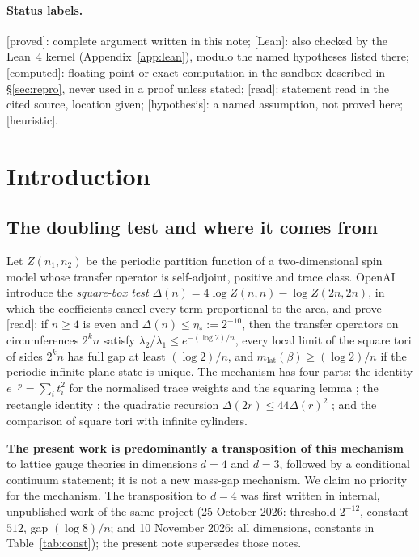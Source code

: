 \documentclass[11pt,a4paper]{article}
\theoremstyle{plain}
\theoremstyle{definition}
\theoremstyle{remark}
\numberwithin{equation}{section}
\newcommand{\st}[1]{\textsf{[#1]}}
\begin{document}
\paragraph{Status labels.}
\st{proved}: complete argument written in this note; \st{Lean}: also checked by the Lean~4 kernel (Appendix~\ref{app:lean}), modulo
the named hypotheses listed there; \st{computed}: floating-point or exact computation in the sandbox described in
\S\ref{sec:repro}, never used in a proof unless stated; \st{read}: statement read in the cited source, location given;
\st{hypothesis}: a named assumption, not proved here; \st{heuristic}.

{\small\setcounter{tocdepth}{1}\tableofcontents}

\section{Introduction}\label{sec:intro}

\subsection{The doubling test and where it comes from}
Let $Z(n_1,n_2)$ be the periodic partition function of a two-dimensional spin model whose transfer operator is self-adjoint, positive
and trace class. OpenAI \cite[\S2]{OAI26} introduce the \emph{square-box test} $\Delta(n)=4\log Z(n,n)-\log Z(2n,2n)$, in which the
coefficients cancel every term proportional to the area, and prove \cite[Prop.~2.2]{OAI26} \st{read}: if $n\ge4$ is even and
$\Delta(n)\le\eta_*:=2^{-10}$, then the transfer operators on circumferences $2^kn$ satisfy $\lambda_2/\lambda_1\le e^{-(\log 2)/n}$,
every local limit of the square tori of sides $2^kn$ has full gap at least $(\log2)/n$, and $m_{\mathrm{lat}}(\beta)\ge(\log 2)/n$ if
the periodic infinite-plane state is unique. The mechanism has four parts: the identity $e^{-p}=\sum_it_i^2$ for the normalised trace
weights and the squaring lemma \cite[Lemma~2.1]{OAI26}; the rectangle identity \cite[(2.7)]{OAI26}; the quadratic recursion
$\Delta(2r)\le44\Delta(r)^2$ \cite[(2.12)]{OAI26}; and the comparison of square tori with infinite cylinders.

\textbf{The present work is predominantly a transposition of this mechanism} to lattice gauge theories in dimensions $d=4$ and $d=3$,
followed by a conditional continuum statement; it is not a new mass-gap mechanism. We claim no priority for the mechanism. The transposition
to $d=4$ was first written in internal, unpublished work of the same project (25 October 2026: threshold $2^{-12}$, constant $512$, gap
$(\log8)/n$; and 10 November 2026: all dimensions, constants in Table~\ref{tab:const}); the present note supersedes those notes.
\end{document}
